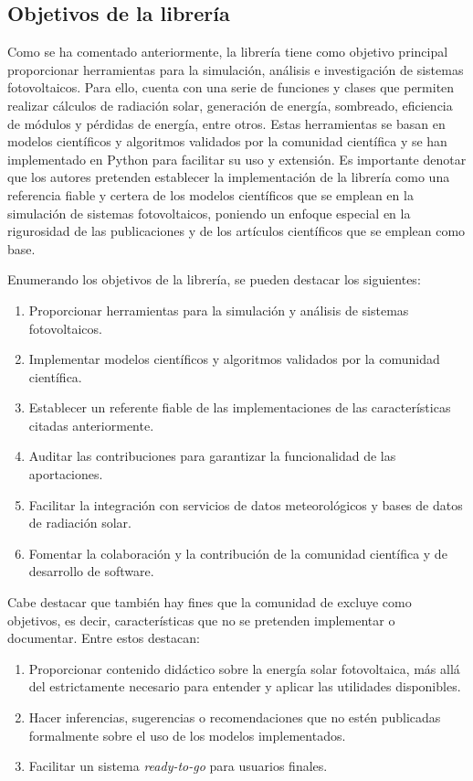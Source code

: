 \subsection{Objetivos de la librería} \label{ssct:pvlib:objetivos}

Como se ha comentado anteriormente, la \gls{librería} \pvlibpy{} tiene como objetivo principal proporcionar herramientas para la simulación, análisis e investigación de sistemas fotovoltaicos. Para ello, cuenta con una serie de funciones y clases que permiten realizar cálculos de radiación solar, generación de energía, sombreado, eficiencia de módulos y pérdidas de energía, entre otros. Estas herramientas se basan en modelos científicos y algoritmos validados por la comunidad científica y se han implementado en Python para facilitar su uso y extensión. Es importante denotar que los autores pretenden establecer la implementación de la librería como una referencia fiable y certera de los modelos científicos que se emplean en la \gls{simulación} de sistemas fotovoltaicos, poniendo un enfoque especial en la rigurosidad de las publicaciones y de los artículos científicos que se emplean como base.

Enumerando los objetivos de la librería, se pueden destacar los siguientes:

\begin{enumerate}
    \item Proporcionar herramientas para la \gls{simulación} y análisis de sistemas fotovoltaicos.
    \item Implementar modelos científicos y algoritmos validados por la comunidad científica.
    \item Establecer un referente fiable de las implementaciones de las características citadas anteriormente.
    \item Auditar las contribuciones para garantizar la funcionalidad de las aportaciones.
    \item Facilitar la integración con servicios de datos meteorológicos y bases de datos de radiación solar.
    \item Fomentar la colaboración y la contribución de la comunidad científica y de desarrollo de software.
\end{enumerate}

Cabe destacar que también hay fines que la comunidad de \pvlibpy{} excluye como objetivos, es decir, características que no se pretenden implementar o documentar. Entre estos destacan:

\begin{enumerate}
    \item Proporcionar contenido didáctico sobre la energía solar fotovoltaica, más allá del estrictamente necesario para entender y aplicar las utilidades disponibles.
    \item Hacer inferencias, sugerencias o recomendaciones que no estén publicadas formalmente sobre el uso de los modelos implementados.
    \item Facilitar un sistema \textit{ready-to-go} para usuarios finales.
\end{enumerate}

